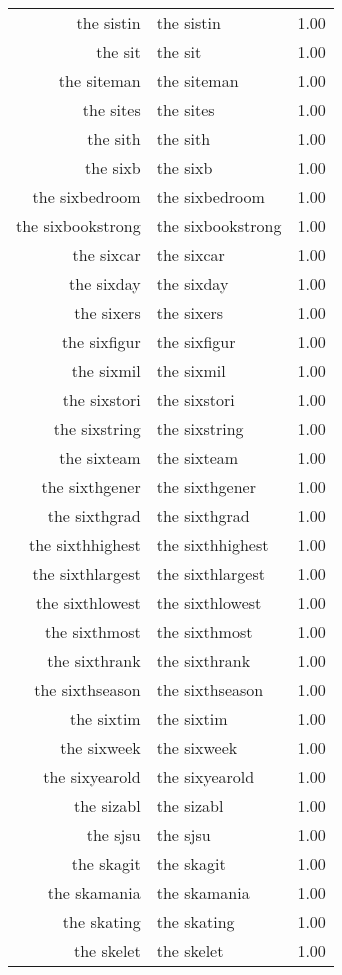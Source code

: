 \begin{table}[ht]
\begin{tabular}{rlr}
  the sistin & the sistin & 1.00 \\ 
  the sit & the sit & 1.00 \\ 
  the siteman & the siteman & 1.00 \\ 
  the sites & the sites & 1.00 \\ 
  the sith & the sith & 1.00 \\ 
  the sixb & the sixb & 1.00 \\ 
  the sixbedroom & the sixbedroom & 1.00 \\ 
  the sixbookstrong & the sixbookstrong & 1.00 \\ 
  the sixcar & the sixcar & 1.00 \\ 
  the sixday & the sixday & 1.00 \\ 
  the sixers & the sixers & 1.00 \\ 
  the sixfigur & the sixfigur & 1.00 \\ 
  the sixmil & the sixmil & 1.00 \\ 
  the sixstori & the sixstori & 1.00 \\ 
  the sixstring & the sixstring & 1.00 \\ 
  the sixteam & the sixteam & 1.00 \\ 
  the sixthgener & the sixthgener & 1.00 \\ 
  the sixthgrad & the sixthgrad & 1.00 \\ 
  the sixthhighest & the sixthhighest & 1.00 \\ 
  the sixthlargest & the sixthlargest & 1.00 \\ 
  the sixthlowest & the sixthlowest & 1.00 \\ 
  the sixthmost & the sixthmost & 1.00 \\ 
  the sixthrank & the sixthrank & 1.00 \\ 
  the sixthseason & the sixthseason & 1.00 \\ 
  the sixtim & the sixtim & 1.00 \\ 
  the sixweek & the sixweek & 1.00 \\ 
  the sixyearold & the sixyearold & 1.00 \\ 
  the sizabl & the sizabl & 1.00 \\ 
  the sjsu & the sjsu & 1.00 \\ 
  the skagit & the skagit & 1.00 \\ 
  the skamania & the skamania & 1.00 \\ 
  the skating & the skating & 1.00 \\ 
  the skelet & the skelet & 1.00 \\ 

\end{tabular}
\end{table}
